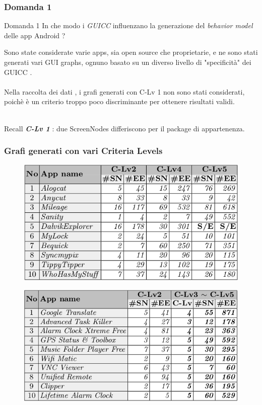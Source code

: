 \documentclass[12pt]{beamer}
\begin{document}
\begin{frame}
\frametitle{Domanda 1}

\begin{block}{Domanda 1}
In che modo i \emph{GUICC} influenzano la generazione del \textit{behavior model} delle app Android ?
\end{block}

Sono state considerate varie apps, sia open source che proprietarie, e ne sono stati generati vari GUI graphs, ognuno basato su un diverso livello di "specificit\`a" dei GUICC .
\\~\\

Nella raccolta dei dati , i grafi generati con C-Lv 1 non sono stati considerati, poich\`e \`e un criterio troppo poco discriminante per ottenere risultati validi.
\\~\\

\begin{block}{Recall} 
\textit{\textbf{C-Lv 1}} : due ScreenNodes differiscono per il package di appartenenza.
\end{block}
\end{frame}


\begin{frame}
\frametitle{Grafi generati con vari Criteria Levels}

\begin{figure}
\includegraphics[width=0.55\linewidth]{images/GraphWidthForOpenSource.png}
\end{figure}
\begin{figure}
\includegraphics[width=0.55\linewidth]{images/GraphWidthForGstore.png}
\end{figure}
\end{frame}
\end{document}
